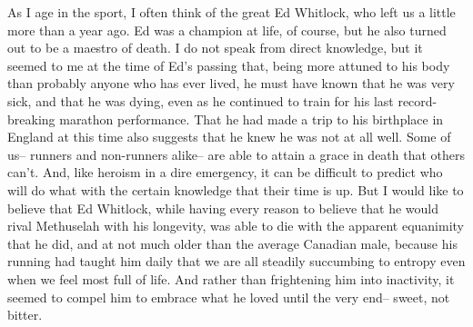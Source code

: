 As I age in the sport, I often think of the great Ed Whitlock, who left us a little more than a year ago. Ed was a champion at life, of course, but he also turned out to be a maestro of death. I do not speak from direct knowledge, but it seemed to me at the time of Ed's passing that, being more attuned to his body than probably anyone who has ever lived, he must have known that he was very sick, and that he was dying, even as he continued to train for his last record-breaking marathon performance. That he had made a trip to his birthplace in England at this time also suggests that he knew he was not at all well. Some of us-- runners and non-runners alike-- are able to attain a grace in death that others can't. And, like heroism in a dire emergency, it can be difficult to predict who will do what with the certain knowledge that their time is up. But I would like to believe that Ed Whitlock, while having every reason to believe that he would rival Methuselah with his longevity, was able to die with the apparent equanimity that he did, and at not much older than the average Canadian male, because his running had taught him daily that we are all steadily succumbing to entropy even when we feel most full of life. And rather than frightening him into inactivity, it seemed to compel him to embrace what he loved until the very end-- sweet, not bitter.




